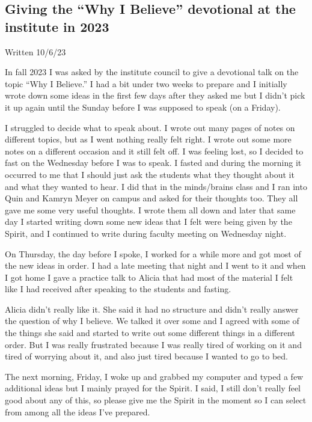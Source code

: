 	\subsection{Giving the ``Why I Believe'' devotional at the institute in 2023}
		\label{SE-WHY}
		
		Written 10/6/23
		
		In fall 2023 I was asked by the institute council to give a devotional talk on the topic ``Why I Believe.'' I had a bit under two weeks to prepare and I initially wrote down some ideas in the first few days after they asked me but I didn't pick it up again until the Sunday before I was supposed to speak (on a Friday).
		
		I struggled to decide what to speak about. I wrote out many pages of notes on different topics, but as I went nothing really felt right. I wrote out some more notes on a different occasion and it still felt off. I was feeling lost, so I decided to fast on the Wednesday before I was to speak. I fasted and during the morning it occurred to me that I should just ask the students what they thought about it and what they wanted to hear. I did that in the minds/brains class and I ran into Quin and Kamryn Meyer on campus and asked for their thoughts too. They all gave me some very useful thoughts. I wrote them all down and later that same day I started writing down some new ideas that I felt were being given by the Spirit, and I continued to write during faculty meeting on Wednesday night.
		
		On Thursday, the day before I spoke, I worked for a while more and got most of the new ideas in order. I had a late meeting that night and I went to it and when I got home I gave a practice talk to Alicia that had most of the material I felt like I had received after speaking to the students and fasting.
		
		Alicia didn't really like it. She said it had no structure and didn't really answer the question of why I believe. We talked it over some and I agreed with some of the things she said and started to write out some different things in a different order. But I was really frustrated because I was really tired of working on it and tired of worrying about it, and also just tired because I wanted to go to bed. 
		
		The next morning, Friday, I woke up and grabbed my computer and typed a few additional ideas but I mainly prayed for the Spirit. I said, I still don't really feel good about any of this, so please give me the Spirit in the moment so I can select from among all the ideas I've prepared.
		
